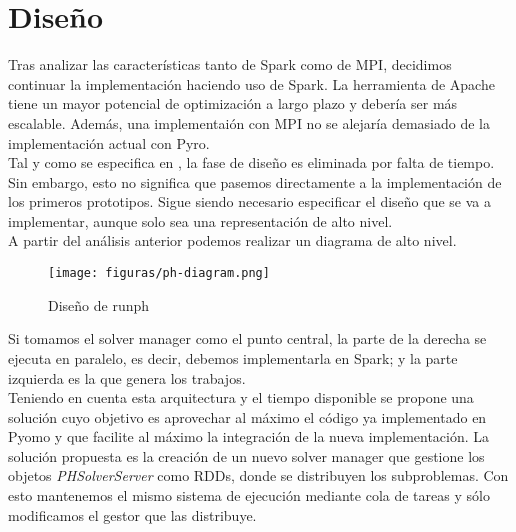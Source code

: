 \chapter{Diseño}


Tras analizar las características tanto de Spark como de MPI, decidimos continuar la implementación haciendo uso de Spark. La herramienta de Apache tiene un mayor potencial de optimización a largo plazo y debería ser más escalable. Además, una implementaión con MPI no se alejaría demasiado de la implementación actual con Pyro.\\

Tal y como se especifica en \cite{sec:modificacionesCronograma}, la fase de diseño es eliminada por falta de tiempo. Sin embargo, esto no significa que pasemos directamente a la implementación de los primeros prototipos. Sigue siendo necesario especificar el diseño que se va a implementar, aunque solo sea una representación de alto nivel.\\

A partir del análisis anterior podemos realizar un diagrama de alto nivel.

\begin{figure}[H]
    \centerline{\texttt{[image: figuras/ph-diagram.png]}}
    \caption{Diseño de runph}
    \label{fig:ph-diagram}
\end{figure}

Si tomamos el solver manager como el punto central, la parte de la derecha se ejecuta en paralelo, es decir, debemos implementarla en Spark; y la parte izquierda es la que genera los trabajos.\\

Teniendo en cuenta esta arquitectura y el tiempo disponible se propone una solución cuyo objetivo es aprovechar al máximo el código ya implementado en Pyomo y que facilite al máximo la integración de la nueva implementación. La solución propuesta es la creación de un nuevo solver manager que gestione los objetos \textit{PHSolverServer} como RDDs, donde se distribuyen los subproblemas. Con esto mantenemos el mismo sistema de ejecución mediante cola de tareas y sólo modificamos el gestor que las distribuye. 